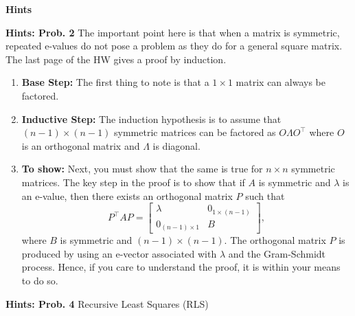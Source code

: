 \documentclass[letterpaper]{article}
\begin{document}
\newpage

\begin{center}
{\bf Hints}
\end{center}

\noindent \textbf{Hints: Prob. 2} The important point here is that when a matrix is symmetric, repeated e-values do not pose a problem as they do for a general square matrix.
The last page of the HW gives a proof by induction.

 \begin{enumerate}
\setlength{\itemsep}{.1in}
\renewcommand{\labelenumi}{(\alph{enumi})}

\item \textbf{Base Step:} The first thing to note is that a $1 \times 1$ matrix can always be factored.

\item \textbf{Inductive Step:} The induction hypothesis is to assume
that $(n-1) \times (n-1)$ symmetric matrices can be factored as $O \Lambda O^\top$ where $O$ is an orthogonal matrix and $\Lambda$ is diagonal.

\item \textbf{To show:} Next, you must show  that the same is true for
 $n \times n$ symmetric matrices. The key step in the proof is to show that if $A$ is symmetric and $\lambda$ is an e-value, then there exists an orthogonal matrix $P$ such
that
$$P^\top A P = \left[ \begin{array}{cc} \lambda  & 0_{1\times (n-1)} \\ 0_{(n-1) \times 1} & B \end{array} \right], $$
where $B$ is symmetric and $(n-1) \times (n-1)$. The orthogonal matrix $P$ is produced by using an e-vector associated with $\lambda$ and the Gram-Schmidt process. Hence, if you care
to understand the proof, it is within your means to do so.

\end{enumerate}

\vspace{1cm}

\noindent \textbf{Hints: Prob. 4 } Recursive Least Squares (RLS)
\end{document}
